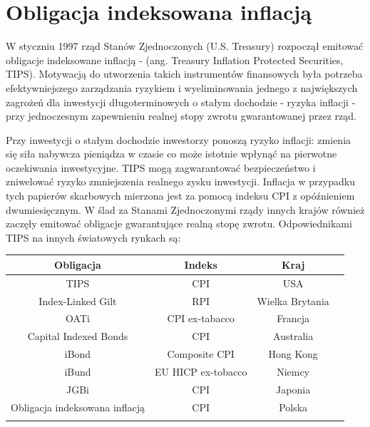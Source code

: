 \documentclass{mini}
\theoremstyle{mythstyle}
\begin{document}
	\section{Obligacja indeksowana inflacją}
	
	W styczniu 1997 rząd Stanów Zjednoczonych (U.S. Treasury) rozpoczął emitować obligacje indeksowane inflacją - (ang. Treasury Inflation Protected Securities, TIPS). Motywacją do utworzenia takich instrumentów finansowych była potrzeba efektywniejszego zarządzania ryzykiem i wyeliminowania jednego z największych zagrożeń dla inwestycji długoterminowych o stałym dochodzie - ryzyka inflacji - przy jednoczesnym zapewnieniu realnej stopy zwrotu gwarantowanej przez rząd. 
	
	Przy inwestycji o stałym dochodzie inwestorzy ponoszą ryzyko inflacji: zmienia się siła nabywcza pieniądza w czasie co może istotnie wpłynąć na pierwotne oczekiwania inwestycyjne. TIPS mogą zagwarantować bezpieczeństwo i zniwelować ryzyko zmniejszenia realnego zysku inwestycji. Inflacja w przypadku tych papierów skarbowych mierzona jest za pomocą indeksu CPI z opóźnieniem dwumiesięcznym. W ślad za Stanami Zjednoczonymi rządy innych krajów również zaczęły emitować obligacje gwarantujące realną stopę zwrotu. Odpowiednikami TIPS na innych światowych rynkach są:
	
	\begin{center}
	\begin{tabular}{c c c c}
		\textbf{Obligacja} & \textbf{Indeks} & \textbf{Kraj}  \\ \hline
		TIPS & CPI & USA  \\
		Index-Linked Gilt  & RPI & Wielka Brytania \\
		OATi & CPI ex-tabacco & Francja   \\
		Capital Indexed Bonds & CPI & Australia   \\
		iBond & Composite CPI& Hong Kong   \\
		iBund & EU HICP ex-tobacco & Niemcy  \\
		JGBi & CPI & Japonia \\
		Obligacja indeksowana inflacją & CPI & Polska\\ \\
   
	\end{tabular}
\end{center}
\end{document}
